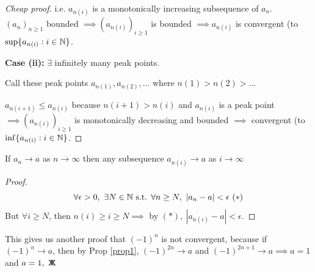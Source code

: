 \documentclass[10pt,twoside]{scrartcl}
\newcommand*{\cont}{%
  \mathsf{X}\mkern-8.5mu\mathsf{X}%
}
\begin{document}
\begin{proof}[Cheap proof]
i.e. $a_{n(i)}$ is a monotonically increasing subsequence of $a_n$. $(a_n)_{n\geq 1}$ bounded $\implies (a_{n(i)})_{i\geq 1}$ is bounded $\implies a_{n(i)}$ is convergent (to $\mathrm{sup}\{a_{n(i)} : i \in\mathbb{N}\}$.


\textbf{Case (ii):} $\exists$ infinitely many peak points. 

Call these peak points $a_{n(1)}, a_{n(2)},\dots$ where $n(1) > n(2) > \dots$

\begin{center}
\end{center}

$a_{n(i+1)} \leq a_{n(i)}$ because $n(i+1) > n(i)$ and $a_{n(i)}$ is a peak point $\implies (a_{n(i)})_{i\geq 1}$ is monotonically decreasing and bounded $\implies$ convergent (to $\mathrm{inf}\{a_{n(i)} : i \in\mathbb{N}\}$.
\end{proof}\vspace*{5pt}



\begin{proposition}\label{prop1}
If $a_n \to a$ as $n\to \infty$ then any subsequence $a_{n(i)} \to a$ as $i \to \infty$	
\end{proposition}

\begin{proof}
\[\forall \epsilon >0,~\exists N \in\mathbb{N} \text{ s.t. } \forall n \geq N,~|a_n - a| < \epsilon ~(*)\]	
But $\forall i \geq N$, then $n(i) \geq i \geq N \implies$ by $(*),~|a_{n(i)} - a| < \epsilon$.
\end{proof}

This gives us another proof that $(-1)^n$ is not convergent, because if $(-1)^n \to a$, then by Prop \ref{prop1}, $(-1)^{2n} \to a$ and $(-1)^{2n+1} \to a \implies a = 1$ and $a = 1,~\cont$\\
\end{document}
